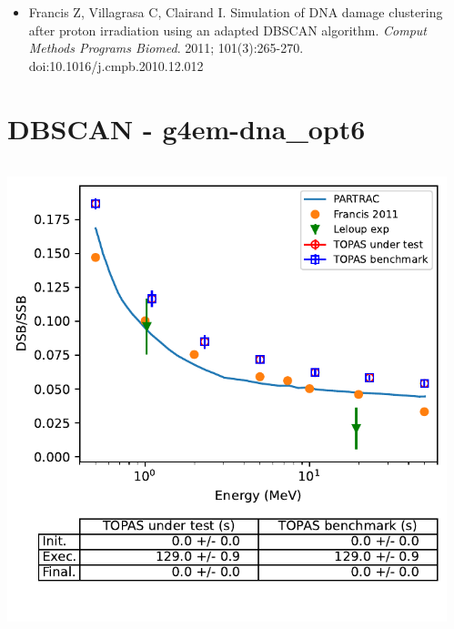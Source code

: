 \documentclass[aspectratio=1610]{beamer}
\begin{document}
\begin{frame}{\secname}
\begin{columns}
\begin{column}{0.6\linewidth}
  \end{column}
 \end{columns}
\begin{itemize}
\item \tiny{Francis Z, Villagrasa C, Clairand I. Simulation of DNA damage clustering after proton irradiation using an adapted DBSCAN algorithm. \textit{Comput Methods Programs Biomed}. 2011; 101(3):265-270. doi:10.1016/j.cmpb.2010.12.012}
\end{itemize}
\end{frame}

\section{DBSCAN - g4em-dna\_opt6}

\begin{frame}{\secname}
 \begin{columns}
  \begin{column}{0.4\linewidth}
   \includegraphics[width=1.1\textwidth]{./DBSCAN/DBSCAN2_g4em-dna_opt6}
  \end{column}
  \begin{column}{0.6\linewidth} 

\end{column}
\end{columns}
\end{frame}
\end{document}
